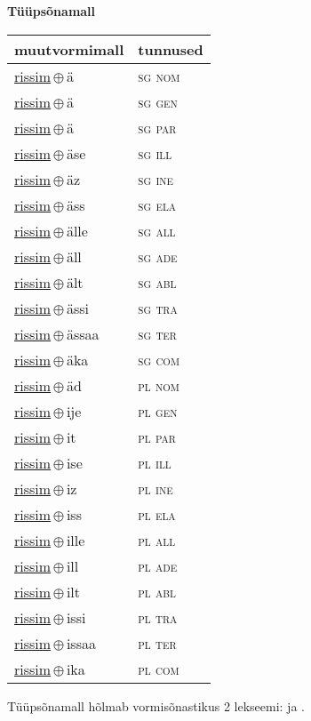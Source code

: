 

\vspace{3.5em}
\noindent \begin{minipage}{\textwidth}
\noindent \textbf{Tüüpsõnamall \,}\\

\begin{sideways}
\begin{tabular}{l l}
muutvormimall & tunnused \\
\hline
\underline{rissim}\,$\oplus$\,ä & \textsc{ sg nom } \\
\underline{rissim}\,$\oplus$\,ä & \textsc{ sg gen } \\
\underline{rissim}\,$\oplus$\,ä & \textsc{ sg par } \\
\underline{rissim}\,$\oplus$\,äse & \textsc{ sg ill } \\
\underline{rissim}\,$\oplus$\,äz & \textsc{ sg ine } \\
\underline{rissim}\,$\oplus$\,äss & \textsc{ sg ela } \\
\underline{rissim}\,$\oplus$\,älle & \textsc{ sg all } \\
\underline{rissim}\,$\oplus$\,äll & \textsc{ sg ade } \\
\underline{rissim}\,$\oplus$\,ält & \textsc{ sg abl } \\
\underline{rissim}\,$\oplus$\,ässi & \textsc{ sg tra } \\
\underline{rissim}\,$\oplus$\,ässaa & \textsc{ sg ter } \\
\underline{rissim}\,$\oplus$\,äka & \textsc{ sg com } \\
\underline{rissim}\,$\oplus$\,äd & \textsc{ pl nom } \\
\underline{rissim}\,$\oplus$\,ije & \textsc{ pl gen } \\
\underline{rissim}\,$\oplus$\,it & \textsc{ pl par } \\
\underline{rissim}\,$\oplus$\,ise & \textsc{ pl ill } \\
\underline{rissim}\,$\oplus$\,iz & \textsc{ pl ine } \\
\underline{rissim}\,$\oplus$\,iss & \textsc{ pl ela } \\
\underline{rissim}\,$\oplus$\,ille & \textsc{ pl all } \\
\underline{rissim}\,$\oplus$\,ill & \textsc{ pl ade } \\
\underline{rissim}\,$\oplus$\,ilt & \textsc{ pl abl } \\
\underline{rissim}\,$\oplus$\,issi & \textsc{ pl tra } \\
\underline{rissim}\,$\oplus$\,issaa & \textsc{ pl ter } \\
\underline{rissim}\,$\oplus$\,ika & \textsc{ pl com } \\
\end{tabular}
\end{sideways}
\label{tab:tüüpsõnamall-rissimä}

\end{minipage}

 
\vspace{1em}
\noindent Tüüpsõnamall  hõlmab vormisõnastikus 2 lekseemi:  ja .
